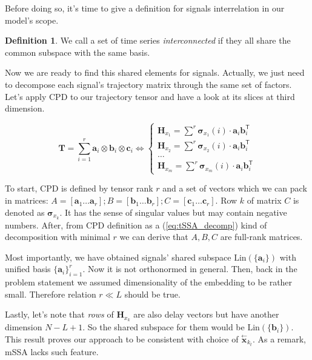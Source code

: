 \documentclass[referee, pdflatex]{sn-jnl}
\theoremstyle{definition}
\newtheorem*{Def}{Definition}
\theoremstyle{plain}
\newcommand{\delayV}[1]{\overset{\leftarrow}{\mathbf{x}}_{#1}}
\begin{document}
	Before doing so, it's time to give a definition for signals interrelation in our model's scope.
	
	\begin{Def}		
		We call a set of time series \emph{interconnected} if they all share the common subspace with the same basis.
	\end{Def}
	
	Now we are ready to find this shared elements for signals. Actually, we just need to decompose each signal's trajectory matrix through the same set of factors. Let's apply CPD to our trajectory tensor and have a look at its slices at third dimension.
	
	\begin{equation}\label{eq:tSSA_decomp}
		\mathbf{T} = \sum\limits_{i = 1}^{r} \mathbf{a}_i \otimes \mathbf{b}_i \otimes \mathbf{c}_i \Leftrightarrow \begin{cases}
			\mathbf{H}_{x_1} = \sum\limits^{r} \boldsymbol{\sigma}_{x_1}(i) \cdot \mathbf{a}_i  \mathbf{b}_i^{\mathsf{T}}  \\
			\mathbf{H}_{x_2} = \sum\limits^{r} \boldsymbol{\sigma}_{x_2}(i) \cdot \mathbf{a}_i  \mathbf{b}_i^{\mathsf{T}} \\
			\ldots \\
			\mathbf{H}_{x_m} = \sum\limits^{r} \boldsymbol{\sigma}_{x_m}(i) \cdot \mathbf{a}_i  \mathbf{b}_i^{\mathsf{T}} 
		\end{cases}
	\end{equation}
	
	To start, CPD is defined by tensor rank $ r $ and a set of vectors which we can pack in matrices: $ A = [\mathbf{a}_1 \ldots \mathbf{a}_r]; B = [\mathbf{b}_1 \ldots \mathbf{b}_r]; C = [\mathbf{c}_1 \ldots \mathbf{c}_r] $. Row $ k $ of matrix $ C $ is denoted as $ \boldsymbol{\sigma}_{x_k} $. It has the sense of singular values but may contain negative numbers. After, from CPD definition as a (\ref{eq:tSSA_decomp}) kind of decomposition with minimal $ r $ we can derive that $ A, B, C $ are full-rank matrices.
	
	Most importantly, we have obtained signals' shared subspace $ \text{Lin}(\{\mathbf{a}_i\}) $ with unified basis $ \{\mathbf{a}_i\}_{i = 1}^r $. Now it is not orthonormed in general. Then, back in the problem statement we assumed dimensionality of the embedding to be rather small. Therefore relation $ r \ll L $ should be true.
	
	Lastly, let's note that \emph{rows} of $ \mathbf{H}_{x_k} $ are also delay vectors but have another dimension $ N - L + 1 $. So the shared subspace for them would be $ \text{Lin}(\{\mathbf{b}_i\}) $. This result proves our approach to be consistent with choice of $ \delayV{k_t} $. As a remark, mSSA lacks such feature.
	
\end{document}
